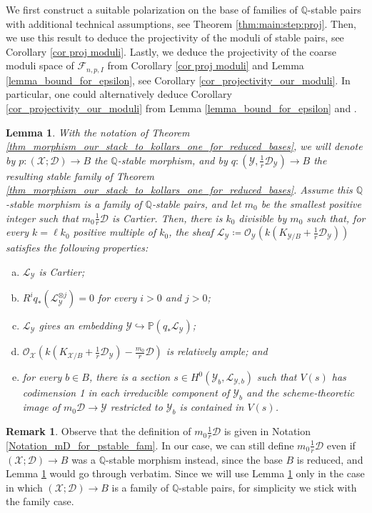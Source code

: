 \documentclass{amsart}
\newcommand{\bP}{\mathbb{P}}
\newcommand{\bQ}{\mathbb{Q}}
\newcommand{\sF}{\mathscr{F}}
\newcommand{\cD}{\mathcal{D}}
\newcommand{\cL}{\mathcal{L}}
\newcommand{\cO}{\mathcal{O}}
\newcommand{\cX}{\mathcal{X}}
\newcommand{\cY}{\mathcal{Y}}
\newtheorem{Lemma}[theorem]{Lemma}
\theoremstyle{definition}
\newtheorem{Remark}[theorem]{Remark}
\begin{document}
We first construct a suitable polarization on the base of
families of $\bQ$-stable pairs with additional technical assumptions, see Theorem \ref{thm:main:step:proj}.
Then, we use this result to deduce the projectivity of the moduli of stable pairs, see Corollary \ref{cor proj moduli}.
Lastly, we deduce the projectivity of the coarse moduli space of $\sF_{n,p,I}$ from Corollary \ref{cor proj moduli} and Lemma \ref{lemma_bound_for_epsilon}, see Corollary \ref{cor_projectivity_our_moduli}.
In particular, one could alternatively deduce Corollary \ref{cor_projectivity_our_moduli} from Lemma \ref{lemma_bound_for_epsilon} and \cite{KP17}.



\begin{Lemma}\label{Lemma_there_is_a_section_vanishing_on_the_divisor}
With the notation of Theorem \ref{thm_morphism_our_stack_to_kollars_one_for_reduced_bases}, we will denote by $p\colon (\cX;\cD)\to B$ the
$\bQ$-stable morphism, and by $q \colon (\cY,\frac{1}{r}\cD_\cY)\to B$ the resulting stable family of Theorem \ref{thm_morphism_our_stack_to_kollars_one_for_reduced_bases}.
Assume this $\bQ$-stable morphism is a
family of $\bQ$-stable pairs, and let $m_0$ be the smallest positive integer such that $m_0\frac{1}{r}\cD$ is Cartier.
Then, there is $k_0$ divisible by $m_0$ such that, for every $k=\ell k_0$ positive multiple of $k_0$, the sheaf  $\cL_{\cY} \coloneqq \cO_\cY(k(K_{\cY/B} + \frac{1}{r}\cD_\cY))$ satisfies the following properties:
\begin{enumerate}[(a)]
    \item $\cL_\cY$ is Cartier;
    \item $R^iq_*(\cL_\cY^{\otimes j}) = 0$ for every $i>0$ and $j>0$;
    \item $\cL_\cY$ gives an embedding $\cY\hookrightarrow \bP(q_*\cL_\cY)$;
    \item $\cO_\cX(k(K_{\cX/B} + \frac{1}{r}\cD_\cY) - \frac{m_0}{r}\cD)$ is relatively ample; and
    \item for every $b\in B$, there is a section $s\in H^0(\cY_b, \cL_{\cY,b})$ such that $V(s)$ has codimension 1 in each irreducible component of $\cY_b$ and the scheme-theoretic image of $m_0\cD\to \cY$ restricted to $\cY_b$ is contained in $V(s)$.
\end{enumerate}
\end{Lemma}

\begin{Remark}
Observe that the definition of $m_0\frac{1}{r}\cD$ is given in Notation \ref{Notation_mD_for_pstable_fam}.
In our case, we can still define $m_0\frac{1}{r}\cD$ even if $(\cX;\cD)\to B$ was a $\bQ$-stable morphism instead, since the base $B$ is reduced, and Lemma \ref{Lemma_there_is_a_section_vanishing_on_the_divisor} would go through verbatim.
Since we will use Lemma \ref{Lemma_there_is_a_section_vanishing_on_the_divisor} only in the case in which $(\cX;\cD)\to B$ is a
family of $\bQ$-stable pairs, for simplicity we stick with the family case.
\end{Remark}
\end{document}
